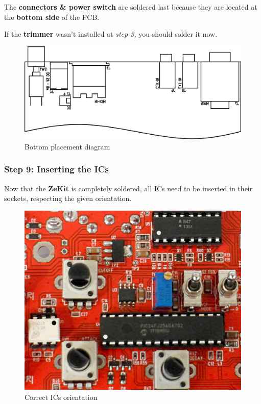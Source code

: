 \documentclass{scrartcl}
\begin{document}
The \textbf{connectors \& power switch} are soldered last because they are located at the \textbf{bottom side} of the PCB.

If the \textbf{trimmer} wasn't installed at \emph{step 3,} you should solder it now.

\begin{figure}[!ht]
    \begin{center}
        \includegraphics[scale=0.70]{assets/pcb-bot.png}
        \caption{Bottom placement diagram}
    \end{center}
\end{figure}

\subsubsection{Step 9: Inserting the ICs}

Now that the \textbf{ZeKit} is completely soldered, all ICs need to be inserted in their sockets, respecting the given orientation.

\vspace{0.50cm}
\begin{figure}[!ht]
    \begin{center}
        \includegraphics[scale=0.25]{assets/ic-orientation.jpg}
        \caption{Correct ICs orientation}
    \end{center}
\end{figure}
\end{document}
